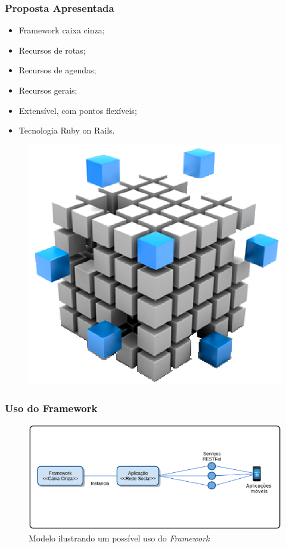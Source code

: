 \documentclass{beamer}
\begin{document}
\begin{frame}
\frametitle{Proposta Apresentada}

\begin{itemize}
	\item Framework caixa cinza;
	\item Recursos de rotas;
	\item Recursos de agendas;
	\item Recursos gerais;
	\item Extensível, com pontos flexíveis;
	\item Tecnologia Ruby on Rails.
\end{itemize}

\begin{figure}[h]
	\centering
	\includegraphics[scale=0.35]{figuras/framework.eps}
\end{figure}

\end{frame}

\begin{frame}
\frametitle{Uso do Framework}

\begin{figure}[!h]
	\centering
	\includegraphics[scale=0.45]{../figuras/proposta/uso_proposto.eps}
	\caption{Modelo ilustrando um possível uso do \textit{Framework}}
	\label{uso_proposto}
\end{figure}

\end{frame}
\end{document}
